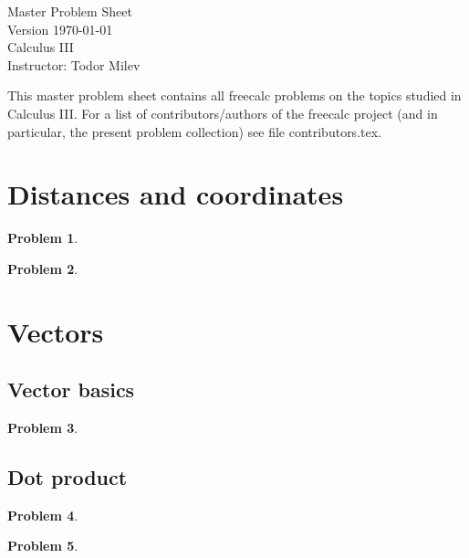 \documentclass{article}
\newtheorem{problem}{Problem}
\begin{document}
\begin{center}
\Large
Master Problem Sheet \\
Version \today
\\ Calculus III \\ \normalsize Instructor: Todor Milev

\end{center}

This master problem sheet contains all freecalc problems on the topics studied in Calculus III. For a list of contributors/authors of the freecalc project (and in particular, the present problem collection) see file contributors.tex.


\fcLicenseContent



\tableofcontents

\section{Distances and coordinates}
\begin{problem}

\end{problem}

\begin{problem}

\end{problem}

\section{Vectors}
\subsection{Vector basics}
\begin{problem}

\end{problem}
\subsection{Dot product}
\begin{problem}

\end{problem}

\begin{problem}

\end{problem}
\end{document}
